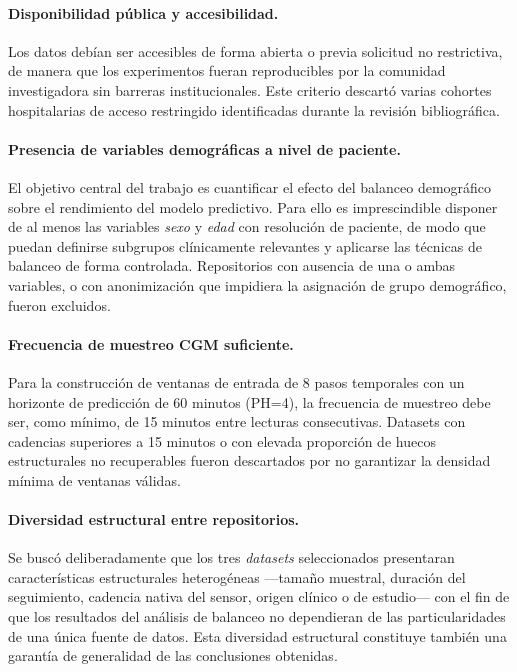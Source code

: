\paragraph{Disponibilidad pública y accesibilidad.} Los datos debían ser accesibles de forma abierta o previa solicitud no restrictiva, de manera que los experimentos fueran reproducibles por la comunidad investigadora sin barreras institucionales. Este criterio descartó varias cohortes hospitalarias de acceso restringido identificadas durante la revisión bibliográfica.

\paragraph{Presencia de variables demográficas a nivel de paciente.} El objetivo central del trabajo es cuantificar el efecto del balanceo demográfico sobre el rendimiento del modelo predictivo. Para ello es imprescindible disponer de al menos las variables \textit{sexo} y \textit{edad} con resolución de paciente, de modo que puedan definirse subgrupos clínicamente relevantes y aplicarse las técnicas de balanceo de forma controlada. Repositorios con ausencia de una o ambas variables, o con anonimización que impidiera la asignación de grupo demográfico, fueron excluidos.

\paragraph{Frecuencia de muestreo CGM suficiente.} Para la construcción de ventanas de entrada de 8 pasos temporales con un horizonte de predicción de 60 minutos (PH=4), la frecuencia de muestreo debe ser, como mínimo, de 15 minutos entre lecturas consecutivas. Datasets con cadencias superiores a 15 minutos o con elevada proporción de huecos estructurales no recuperables fueron descartados por no garantizar la densidad mínima de ventanas válidas.

\paragraph{Diversidad estructural entre repositorios.} Se buscó deliberadamente que los tres \textit{datasets} seleccionados presentaran características estructurales heterogéneas ---tamaño muestral, duración del seguimiento, cadencia nativa del sensor, origen clínico o de estudio--- con el fin de que los resultados del análisis de balanceo no dependieran de las particularidades de una única fuente de datos. Esta diversidad estructural constituye también una garantía de generalidad de las conclusiones obtenidas.

